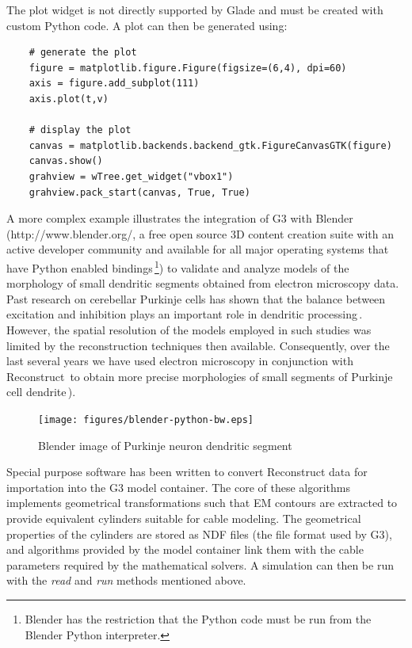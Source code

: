 \documentclass[12pt]{article}
\begin{document}
The plot widget is not directly supported by Glade and must be created
with custom Python code.  A plot can then be generated using:

{\footnotesize
  \resetlinenumber[5]
\begin{verbatim}
    # generate the plot
    figure = matplotlib.figure.Figure(figsize=(6,4), dpi=60)
    axis = figure.add_subplot(111)
    axis.plot(t,v)

    # display the plot
    canvas = matplotlib.backends.backend_gtk.FigureCanvasGTK(figure)
    canvas.show()
    grahview = wTree.get_widget("vbox1")
    grahview.pack_start(canvas, True, True)
\end{verbatim}
}

A more complex example illustrates the integration of G3 with Blender
(http://www.blender.org/, a free open source 3D content creation suite
with an active developer community and available for all major
operating systems that have Python enabled bindings\,\footnote{Blender
  has the restriction that the Python code must be run from the
  Blender Python interpreter.}) to validate and analyze models of the
morphology of small dendritic segments obtained from electron
microscopy data. Past research on cerebellar Purkinje cells has shown
that the balance between excitation and inhibition plays an important
role in dendritic processing\,\cite{santamaria02:_modul_purkin,
  mittmann07:_linkin_purkin}.  However, the spatial resolution of the
models employed in such studies was limited by the reconstruction
techniques then available.  Consequently, over the last several years
we have used electron microscopy in conjunction with
Reconstruct\,\cite{jc05:_recon}
to obtain more precise morphologies of small segments of Purkinje cell
dendrite\,\cite{lu09:_d_purkin, cornelis08:_model_neuros_genes}).

\begin{figure}[ht]
  \centering
    \texttt{[image: figures/blender-python-bw.eps]}
  \caption{Blender image of Purkinje neuron dendritic segment}
  \label{fig:cbi-blender}
\end{figure}


Special purpose software has been written to convert Reconstruct data
for importation into the G3 model container.  The core of these
algorithms implements geometrical transformations such that EM
contours are extracted to provide equivalent cylinders suitable for
cable modeling.  The geometrical properties of the cylinders are
stored as NDF files (the file format used by G3), and algorithms
provided by the model container link them with the cable parameters
required by the mathematical solvers.  A simulation can then be run
with the {\it read} and {\it run} methods mentioned above.
\end{document}

